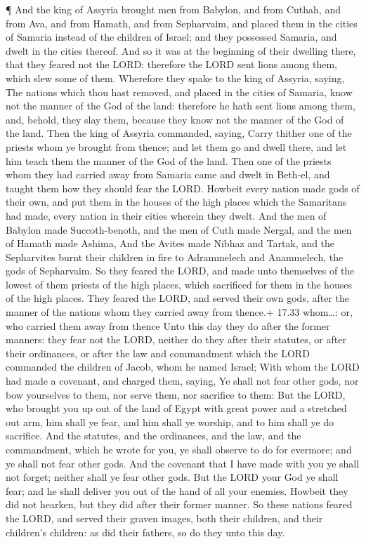  ¶ And the king of Assyria brought men from Babylon, and
from Cuthah, and from Ava, and from Hamath, and from Sepharvaim, and
placed them in the cities of Samaria instead of the children of Israel:
and they possessed Samaria, and dwelt in the cities thereof.
 And so it was at the beginning of their dwelling there,
that they feared not the LORD: therefore the LORD sent lions among them,
which slew some of them.  Wherefore they spake to the king
of Assyria, saying, The nations which thou hast removed, and placed in
the cities of Samaria, know not the manner of the God of the land:
therefore he hath sent lions among them, and, behold, they slay them,
because they know not the manner of the God of the land. 
Then the king of Assyria commanded, saying, Carry thither one of the
priests whom ye brought from thence; and let them go and dwell there,
and let him teach them the manner of the God of the land. 
Then one of the priests whom they had carried away from Samaria came and
dwelt in Beth-el, and taught them how they should fear the LORD.
 Howbeit every nation made gods of their own, and put them
in the houses of the high places which the Samaritans had made, every
nation in their cities wherein they dwelt.  And the men of
Babylon made Succoth-benoth, and the men of Cuth made Nergal, and the
men of Hamath made Ashima,  And the Avites made Nibhaz and
Tartak, and the Sepharvites burnt their children in fire to Adrammelech
and Anammelech, the gods of Sepharvaim.  So they feared the
LORD, and made unto themselves of the lowest of them priests of the high
places, which sacrificed for them in the houses of the high places.
 They feared the LORD, and served their own gods, after the
manner of the nations whom they carried away from thence.+ 17.33
whom\ldots: or, who carried them away from thence  Unto
this day they do after the former manners: they fear not the LORD,
neither do they after their statutes, or after their ordinances, or
after the law and commandment which the LORD commanded the children of
Jacob, whom he named Israel;  With whom the LORD had made a
covenant, and charged them, saying, Ye shall not fear other gods, nor
bow yourselves to them, nor serve them, nor sacrifice to them:
 But the LORD, who brought you up out of the land of Egypt
with great power and a stretched out arm, him shall ye fear, and him
shall ye worship, and to him shall ye do sacrifice.  And
the statutes, and the ordinances, and the law, and the commandment,
which he wrote for you, ye shall observe to do for evermore; and ye
shall not fear other gods.  And the covenant that I have
made with you ye shall not forget; neither shall ye fear other gods.
 But the LORD your God ye shall fear; and he shall deliver
you out of the hand of all your enemies.  Howbeit they did
not hearken, but they did after their former manner.  So
these nations feared the LORD, and served their graven images, both
their children, and their children's children: as did their fathers, so
do they unto this day.

